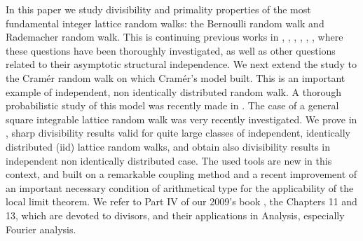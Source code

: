 \documentclass[11pt,draft,reqno]{amsart}
\theoremstyle{definition}
\theoremstyle{remarks}
\numberwithin{equation}{section}
\begin{document}
In this paper we study      divisibility and primality properties of the most  fundamental     integer lattice random walks: the      Bernoulli random walk and Rademacher random walk. This is continuing previous works in  \cite{W5}, \cite{W5a}, \cite{W1}, \cite{W4},     \cite{W7},  
   \cite{W6}, where these questions
     have been thoroughly investigated, as well as other questions related to their  asymptotic structural independence. %
 We next extend the study to  the Cram\'er random walk on which Cram\'er's     model built. This  is an important example of independent, non identically distributed random walk.  A     thorough   probabilistic study 
 of this   model was recently made in \cite{W8}.
     The case of a general square integrable lattice random walk was very recently  investigated. We prove in  \cite{W10},  \cite{W9} sharp divisibility results    valid for quite large classes of independent,   identically distributed  (iid) lattice   random walks, and obtain also divisibility results in independent   non identically distributed   case. The used tools are new in this context, and built on  a remarkable coupling method and a recent improvement of an important necessary condition of arithmetical type for the applicability of the local limit theorem. We   refer to Part IV of our 2009's book   \cite{W2}, the  Chapters 11    and  13, which  are  devoted to divisors, and their applications in Analysis, especially Fourier analysis. 
\end{document}
